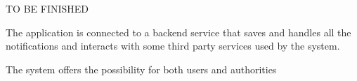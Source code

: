 TO BE FINISHED

The application is connected to a backend service that saves and handles all the notifications and interacts with some third party services used by the system.

The system offers the possibility for both users and authorities 

